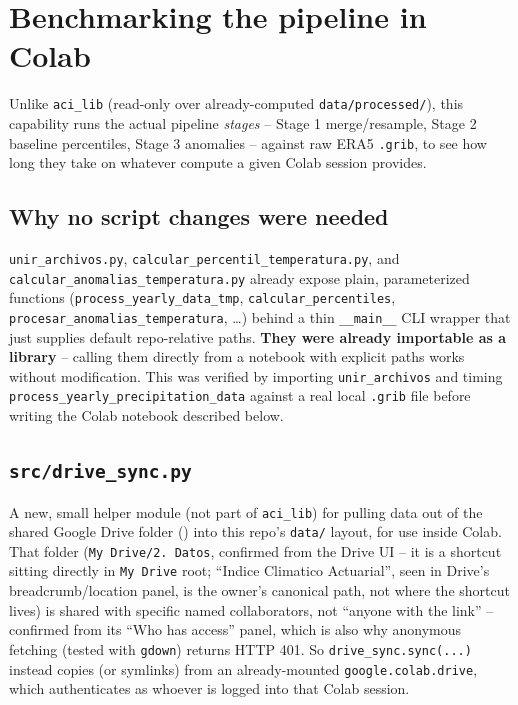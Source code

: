 \documentclass[11pt]{article}
\begin{document}
\section{Benchmarking the pipeline in Colab}
\label{sec:benchmark}

Unlike \texttt{aci\_lib} (read-only over already-computed
\texttt{data/processed/}), this capability runs the actual pipeline
\emph{stages} -- Stage 1 merge/resample, Stage 2 baseline percentiles,
Stage 3 anomalies -- against raw ERA5 \texttt{.grib}, to see how long they
take on whatever compute a given Colab session provides.

\subsection{Why no script changes were needed}

\texttt{unir\_archivos.py}, \texttt{calcular\_percentil\_temperatura.py},
and \texttt{calcular\_anomalias\_temperatura.py} already expose plain,
parameterized functions (\texttt{process\_yearly\_data\_tmp},
\texttt{calcular\_percentiles}, \texttt{procesar\_anomalias\_temperatura},
\dots) behind a thin \texttt{\_\_main\_\_} CLI wrapper that just supplies
default repo-relative paths. \textbf{They were already importable as a
library} -- calling them directly from a notebook with explicit paths
works without modification. This was verified by importing
\texttt{unir\_archivos} and timing
\texttt{process\_yearly\_precipitation\_data} against a real local
\texttt{.grib} file before writing the Colab notebook described below.

\subsection{\texttt{src/drive\_sync.py}}

A new, small helper module (not part of \texttt{aci\_lib}) for pulling data
out of the shared Google Drive folder () into this
repo's \texttt{data/} layout, for use inside Colab. That folder
(\texttt{My Drive/2. Datos}, confirmed from the Drive UI -- it is a
shortcut sitting directly in \texttt{My Drive} root; ``Indice Climatico
Actuarial'', seen in Drive's breadcrumb/location panel, is the owner's
canonical path, not where the shortcut lives) is shared with specific
named collaborators, not ``anyone with the link'' -- confirmed from its
``Who has access'' panel, which is also why anonymous fetching (tested
with \texttt{gdown}) returns HTTP 401. So \texttt{drive\_sync.sync(...)}
instead copies (or symlinks) from an already-mounted
\texttt{google.colab.drive}, which authenticates as whoever is logged into
that Colab session.
\end{document}

